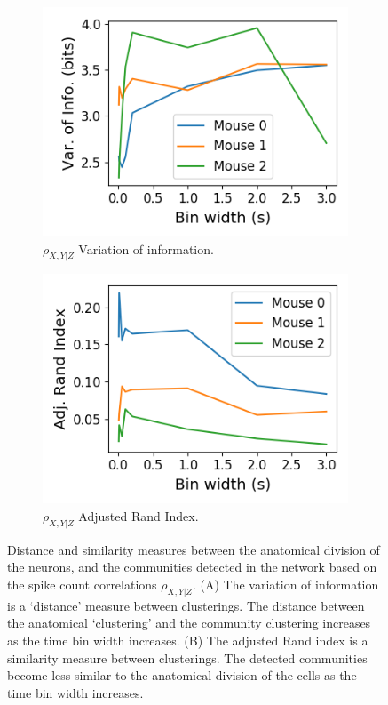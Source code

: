   \begin{figure}[h]
    \begin{subfigure}[h]{0.5\linewidth}
      \includegraphics[width=\linewidth]{figures/eight_probe/variation_of_information_rectified_conditional.png}
      \caption{$\rho_{X,Y|Z}$ Variation of information.}
      \label{fig:variation_of_information_rectified_conditional}
    \end{subfigure}
    \begin{subfigure}[h]{0.5\linewidth}
      \includegraphics[width=\linewidth]{figures/eight_probe/adjusted_rand_index_rectified_conditional.png}
      \caption{$\rho_{X,Y|Z}$ Adjusted Rand Index.}
      \label{fig:adjusted_rand_index_rectified_conditional}
    \end{subfigure}
    \caption{Distance and similarity measures between the anatomical division of the neurons, and the communities detected in the network based on the spike count correlations $\rho_{X,Y|Z}$. (A) The variation of information is a `distance' measure between clusterings. The distance between the anatomical `clustering' and the community clustering increases as the time bin width increases. (B) The adjusted Rand index is a similarity measure between clusterings. The detected communities become less similar to the anatomical division of the cells as the time bin width increases.}
    \label{fig:conditional_clustering_distance_measures}
  \end{figure}

